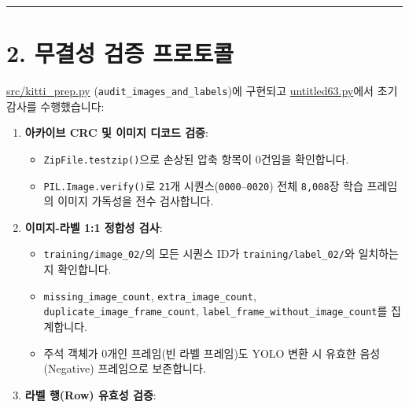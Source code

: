 \documentclass[10.5pt,a4paper]{article}
\begin{document}
\par\noindent\rule{\textwidth}{0.4pt}\par\medskip

\section{2. 무결성 검증 프로토콜}

\href{https://github.com/Heisnotanimposter/Totalcare\_autonomous\_driving\_Yolov5/blob/main/src/kitti\_prep.py}{src/kitti\_prep.py} (\texttt{audit\_\allowbreak{}images\_\allowbreak{}and\_\allowbreak{}labels})에 구현되고 \href{https://github.com/Heisnotanimposter/Totalcare\_autonomous\_driving\_Yolov5/blob/main/untitled63.py}{untitled63.py}에서 초기 감사를 수행했습니다:


\begin{enumerate}[leftmargin=1.8em,itemsep=2pt]
\item \textbf{아카이브 CRC 및 이미지 디코드 검증}:
\begin{itemize}[leftmargin=1.5em,itemsep=2pt]
\item \texttt{ZipFile.\allowbreak{}testzip()}으로 손상된 압축 항목이 0건임을 확인합니다.
\item \texttt{PIL.\allowbreak{}Image.\allowbreak{}verify()}로 \texttt{21}개 시퀀스(\texttt{0000}--\texttt{0020}) 전체 \texttt{8,\allowbreak{}008}장 학습 프레임의 이미지 가독성을 전수 검사합니다.
\end{itemize}
\item \textbf{이미지-라벨 1:1 정합성 검사}:
\begin{itemize}[leftmargin=1.5em,itemsep=2pt]
\item \texttt{training/\allowbreak{}image\_\allowbreak{}02/\allowbreak{}}의 모든 시퀀스 ID가 \texttt{training/\allowbreak{}label\_\allowbreak{}02/\allowbreak{}}와 일치하는지 확인합니다.
\item \texttt{missing\_\allowbreak{}image\_\allowbreak{}count}, \texttt{extra\_\allowbreak{}image\_\allowbreak{}count}, \texttt{duplicate\_\allowbreak{}image\_\allowbreak{}frame\_\allowbreak{}count}, \texttt{label\_\allowbreak{}frame\_\allowbreak{}without\_\allowbreak{}image\_\allowbreak{}count}를 집계합니다.
\item 주석 객체가 0개인 프레임(빈 라벨 프레임)도 YOLO 변환 시 유효한 음성(Negative) 프레임으로 보존합니다.
\end{itemize}
\item \textbf{라벨 행(Row) 유효성 검증}:
\begin{itemize}[leftmargin=1.5em,itemsep=2pt]

\end{itemize}
\end{enumerate}
\end{document}
